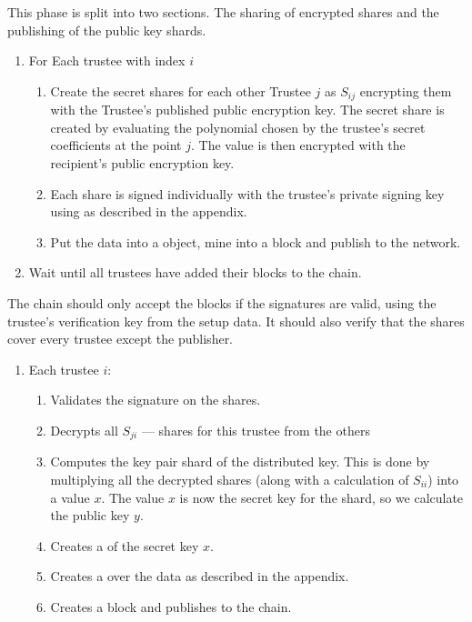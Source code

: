 This phase is split into two sections. The sharing of encrypted shares and the publishing of the public key shards.

\begin{enumerate}
    \item For Each trustee with index $i$
          \begin{enumerate}
              \item Create the secret shares for each other Trustee $j$ as $S_{ij}$ encrypting them with the Trustee's published public encryption key. The secret share is created by evaluating the polynomial chosen by the trustee's secret coefficients at the point $j$. The value is then encrypted with the recipient's public encryption key.
              \item Each share is signed individually with the trustee's private signing key using as described in the appendix.
              \item Put the data into a  object, mine into a block and publish to the network.
          \end{enumerate}
    \item Wait until all trustees have added their blocks to the chain.
\end{enumerate}

The chain should only accept the blocks if the signatures are valid, using the trustee's verification key from the setup data. It should also verify that the shares cover every trustee except the publisher.


\begin{enumerate}
    \item Each trustee $i$:
          \begin{enumerate}
              \item Validates the signature on the shares.
              \item Decrypts all $S_{ji}$ --- shares for this trustee from the others
              \item Computes the key pair shard of the distributed key. This is done by multiplying all the decrypted shares (along with a calculation of $S_{ii}$) into a value $x$. The value $x$ is now the secret key for the shard, so we calculate the public key $y$.
              \item Creates a  of the secret key $x$.
              \item Creates a  over the data as described in the appendix.
              \item Creates a  block and publishes to the chain.
          \end{enumerate}
\end{enumerate}

